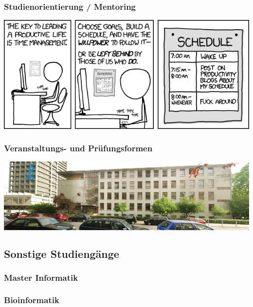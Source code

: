 \documentclass[12pt,a4paper]{scrartcl}
\begin{document}
\subsubsection{Studienorientierung / Mentoring}

\begin{center}
	\includegraphics[scale=0.8]{comics/time_management.png}
\end{center}
\newpage
\subsubsection{Veranstaltungs- und Prüfungsformen}



	\begin{center}
		\includegraphics[scale=1.0]{bilder/rm_pano}
	\end{center}
\subsection{Sonstige Studiengänge}
	\subsubsection{Master Informatik}
	
	\subsubsection{Bioinformatik}
    	
\end{document}
